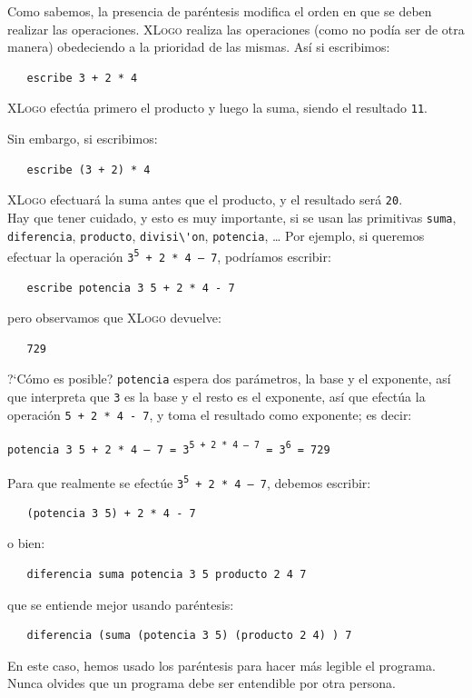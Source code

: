 Como sabemos, la presencia de par\'entesis modifica el orden en que se
deben realizar las operaciones. \textsc{XLogo} realiza las operaciones
(como no pod\'ia ser de otra manera) obedeciendo a la prioridad de las
mismas. As\'i si escribimos:
\begin{verbatim}
   escribe 3 + 2 * 4 \end{verbatim}
\textsc{XLogo} efect\'ua primero el producto y luego la suma, siendo
el resultado \verb+11+.

Sin embargo, si escribimos:
\begin{verbatim}
   escribe (3 + 2) * 4 \end{verbatim}
\textsc{XLogo} efectuar\'a la suma antes que el producto,
y el resultado ser\'a \verb+20+. \\

Hay que tener cuidado, y esto es muy importante, si se usan las
primitivas \verb+suma+, \verb+diferencia+, \verb+producto+,
\verb+divisi\'on+, \verb+potencia+, \ldots{} Por ejemplo,
si queremos efectuar la operaci\'on 
\texttt{3\textsuperscript{5} + 2 * 4 -- 7},
podr\'iamos escribir:
\begin{verbatim}
   escribe potencia 3 5 + 2 * 4 - 7 \end{verbatim}
pero observamos que \textsc{XLogo} devuelve:
\begin{verbatim}
   729 \end{verbatim}
?`C\'omo es posible? \verb+potencia+ espera dos par\'ametros, la base
y el exponente, as\'i que interpreta que \verb+3+ es la base y el
resto es el exponente, as\'i que efect\'ua la operaci\'on 
\verb_5 + 2 * 4 - 7_, y toma el resultado como exponente; es decir:
\begin{center}
  \texttt{potencia 3 5 + 2 * 4 -- 7 =
     3\textsuperscript{\texttt{5 + 2 * 4 -- 7}} = 3\textsuperscript{6} = 729}
\end{center}
Para que realmente se efect\'ue 
\texttt{3\textsuperscript{5} + 2 * 4 -- 7}, debemos
escribir:
\begin{verbatim}
   (potencia 3 5) + 2 * 4 - 7 \end{verbatim}
o bien:
\begin{verbatim}
   diferencia suma potencia 3 5 producto 2 4 7 \end{verbatim}
que se entiende mejor usando par\'entesis:
\begin{verbatim}
   diferencia (suma (potencia 3 5) (producto 2 4) ) 7 \end{verbatim}

En este caso, hemos usado los par\'entesis para hacer m\'as legible el
programa. Nunca olvides que un programa debe ser entendible por otra
persona.

